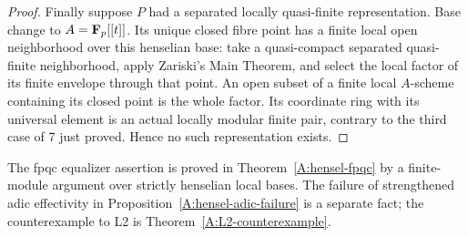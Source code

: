 \begin{proof}
Finally suppose $P$ had a separated locally quasi-finite
representation. Base change to $A=\mathbf F_p[[t]]$. Its unique closed
fibre point has a finite local open neighborhood over this
henselian base: take a quasi-compact separated quasi-finite
neighborhood, apply Zariski's Main Theorem, and select the local
factor of its finite envelope through that point. An open subset
of a finite local $A$-scheme containing its closed point is the
whole factor. Its coordinate ring with its universal element is
an actual locally modular finite pair, contrary to the third
case of 7 just proved. Hence no such representation exists.
\end{proof}

The fpqc equalizer assertion is proved in Theorem~\ref{A:hensel-fpqc}
by a finite-module argument over strictly henselian local bases.
The failure of strengthened adic effectivity in
Proposition~\ref{A:hensel-adic-failure} is a separate fact; the
counterexample to L2 is Theorem~\ref{A:L2-counterexample}.
